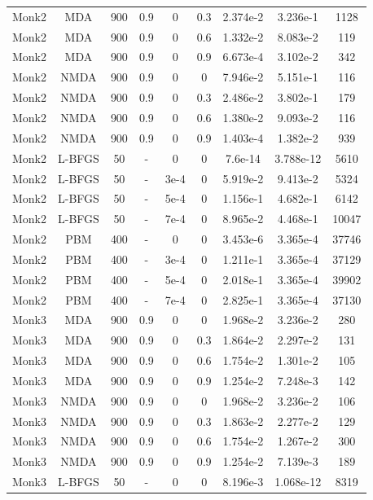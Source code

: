 \begin{center}
\begin{longtable}{|c|c|c|c|c|c|c|c|c|}
			Monk2 & MDA & 900 & 0.9 & 0  & 0.3 & 2.374e-2 & 3.236e-1 & 1128 \\
			Monk2 & MDA & 900 & 0.9 & 0  & 0.6 & 1.332e-2 & 8.083e-2 & 119 \\
			Monk2 & MDA & 900 & 0.9 & 0  & 0.9 & 6.673e-4 & 3.102e-2 & 342\\
			Monk2 & NMDA & 900 & 0.9 & 0  & 0 & 7.946e-2 & 5.151e-1 & 116\\
			Monk2 & NMDA & 900 & 0.9 & 0  & 0.3 & 2.486e-2 & 3.802e-1 & 179\\
			Monk2 & NMDA & 900 & 0.9 & 0  & 0.6 & 1.380e-2 & 9.093e-2 & 116\\
			Monk2 & NMDA & 900 & 0.9 & 0  & 0.9 & 1.403e-4 & 1.382e-2 & 939\\
			Monk2 & L-BFGS & 50 & - & 0  & 0 & 7.6e-14 & 3.788e-12 & 5610\\
			Monk2 & L-BFGS & 50 & - & 3e-4  & 0  & 5.919e-2 & 9.413e-2 & 5324\\
			Monk2 & L-BFGS & 50 & - & 5e-4  & 0  & 1.156e-1& 4.682e-1 & 6142\\
			Monk2 & L-BFGS & 50 & - & 7e-4  & 0  & 8.965e-2 &  4.468e-1 & 10047\\
			Monk2 & PBM & 400 & - & 0  & 0 & 3.453e-6 & 3.365e-4 & 37746\\
			Monk2 & PBM & 400 & - & 3e-4  & 0 & 1.211e-1 & 3.365e-4 & 37129\\
			Monk2 & PBM & 400 & - & 5e-4  & 0 & 2.018e-1 & 3.365e-4 & 39902\\
			Monk2 & PBM & 400 & - & 7e-4  & 0 & 2.825e-1 & 3.365e-4 & 37130\\
			Monk3 & MDA & 900 & 0.9 & 0  & 0 & 1.968e-2 & 3.236e-2 & 280\\
			Monk3 & MDA & 900 & 0.9 & 0  & 0.3 & 1.864e-2 & 2.297e-2 & 131\\
			Monk3 & MDA & 900 & 0.9 & 0  & 0.6 & 1.754e-2 & 1.301e-2 & 105\\
			Monk3 & MDA & 900 & 0.9 & 0  & 0.9 & 1.254e-2 & 7.248e-3 & 142\\
			Monk3 & NMDA & 900 & 0.9 & 0  & 0 & 1.968e-2 & 3.236e-2 & 106\\
			Monk3 & NMDA & 900 & 0.9 & 0  & 0.3 & 1.863e-2 & 2.277e-2 & 129\\
			Monk3 & NMDA & 900 & 0.9 & 0  & 0.6 & 1.754e-2 & 1.267e-2 & 300\\
			Monk3 & NMDA & 900 & 0.9 & 0  & 0.9 & 1.254e-2 & 7.139e-3 & 189\\
			Monk3 & L-BFGS & 50 & - & 0  & 0 & 8.196e-3 & 1.068e-12 & 8319\\

\end{longtable}
\end{center}
